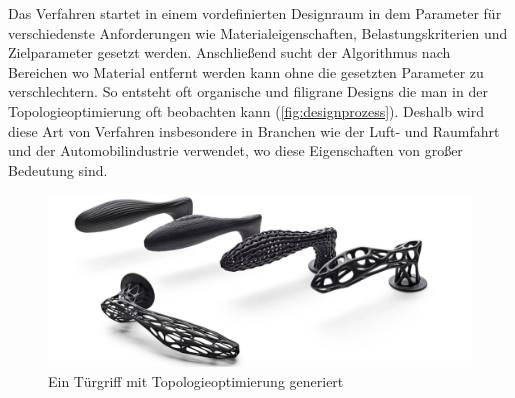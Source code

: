 Das Verfahren startet in einem vordefinierten Designraum in dem Parameter für verschiedenste Anforderungen wie Materialeigenschaften, Belastungskriterien und Zielparameter gesetzt werden. Anschließend sucht der Algorithmus nach Bereichen wo Material entfernt werden kann ohne die gesetzten Parameter zu verschlechtern. So entsteht oft organische und filigrane Designs die man in der Topologieoptimierung oft beobachten kann (\autoref{fig:designprozess}). Deshalb wird diese Art von Verfahren insbesondere in Branchen wie der Luft- und Raumfahrt und der Automobilindustrie verwendet, wo diese Eigenschaften von großer Bedeutung sind. \autocite{19}

\begin{figure}[h]
    \centering
    \begin{minipage}{0.5\textwidth}
      \centering
      \includegraphics[width=\textwidth]{./images/organicDesign.jpeg}
    \end{minipage}
    \caption{Ein Türgriff mit Topologieoptimierung generiert}
    \label{fig:designprozess}
  \end{figure}